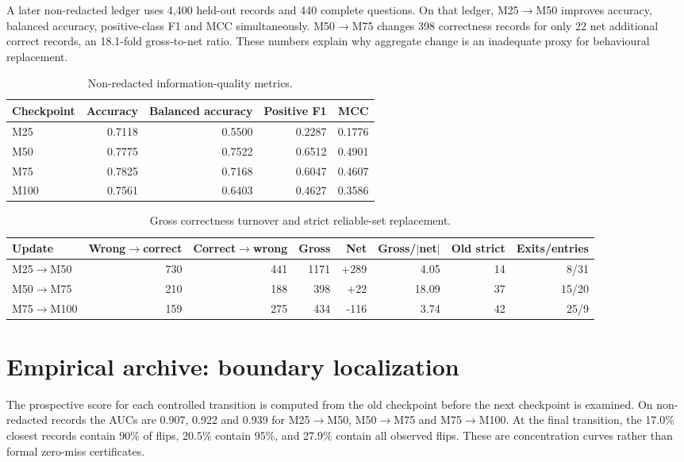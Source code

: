 \documentclass[11pt,letterpaper]{article}
\theoremstyle{plain}
\newcommand{\1}{\mathbf 1}
\begin{document}
A later non-redacted ledger uses 4,400 held-out records and 440 complete questions. On that ledger, M25$\rightarrow$M50 improves accuracy, balanced accuracy, positive-class F1 and MCC simultaneously. M50$\rightarrow$M75 changes 398 correctness records for only 22 net additional correct records, an 18.1-fold gross-to-net ratio. These numbers explain why aggregate change is an inadequate proxy for behavioural replacement.

\begin{table}[H]
\centering
\caption{Non-redacted information-quality metrics.}
\label{tab:s_metrics_archive}
\begin{tabular}{lrrrr}
\toprule
Checkpoint & Accuracy & Balanced accuracy & Positive F1 & MCC\\
\midrule
M25 & 0.7118 & 0.5500 & 0.2287 & 0.1776\\
M50 & 0.7775 & 0.7522 & 0.6512 & 0.4901\\
M75 & 0.7825 & 0.7168 & 0.6047 & 0.4607\\
M100 & 0.7561 & 0.6403 & 0.4627 & 0.3586\\
\bottomrule
\end{tabular}
\end{table}

\begin{table}[H]
\centering
\caption{Gross correctness turnover and strict reliable-set replacement.}
\label{tab:s_gross_turnover}
\begin{tabular}{lrrrrrrr}
\toprule
Update & Wrong$\to$correct & Correct$\to$wrong & Gross & Net & Gross/$|$net$|$ & Old strict & Exits/entries\\
\midrule
M25$\to$M50 & 730 & 441 & 1171 & +289 & 4.05 & 14 & 8/31\\
M50$\to$M75 & 210 & 188 & 398 & +22 & 18.09 & 37 & 15/20\\
M75$\to$M100 & 159 & 275 & 434 & -116 & 3.74 & 42 & 25/9\\
\bottomrule
\end{tabular}
\end{table}

\section{Empirical archive: boundary localization}
The prospective score for each controlled transition is computed from the old checkpoint before the next checkpoint is examined. On non-redacted records the AUCs are 0.907, 0.922 and 0.939 for M25$\to$M50, M50$\to$M75 and M75$\to$M100. At the final transition, the 17.0\% closest records contain 90\% of flips, 20.5\% contain 95\%, and 27.9\% contain all observed flips. These are concentration curves rather than formal zero-miss certificates.
\end{document}
